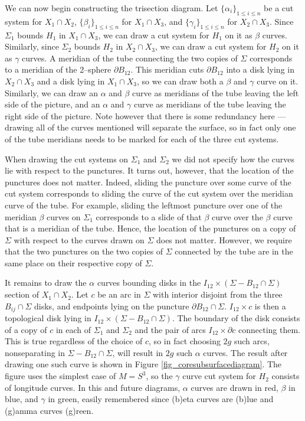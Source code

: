 \documentclass[12pt]{amsart}
\newcommand{\del}{\partial }
\theoremstyle{definition}
\theoremstyle{remark}
\begin{document}
We can now begin constructing the trisection diagram.  Let $\{\alpha_i\}_{1 \le i \le n}$ be a cut system for $X_1 \cap X_2$, $\{\beta_i\}_{1 \le i \le n}$ for $X_1 \cap X_3$, and $\{\gamma_i\}_{1 \le i \le n}$ for $X_2 \cap X_3$.  Since $\Sigma_1$ bounds $H_1$ in $X_1 \cap X_3$, we can draw a cut system for $H_1$ on it as $\beta$ curves.  Similarly, since $\Sigma_2$ bounds $H_2$ in $X_2 \cap X_3$, we can draw a cut system for $H_2$ on it as $\gamma$ curves.  A meridian of the tube connecting the two copies of $\Sigma$ corresponds to a meridian of the 2--sphere $\del B_{12}$.  This meridian cuts $\del B_{12}$ into a disk lying in $X_2 \cap X_3$ and a disk lying in $X_1 \cap X_3$, so we can draw both a $\beta$ and $\gamma$ curve on it.  Similarly, we can draw an $\alpha$ and $\beta$ curve as meridians of the tube leaving the left side of the picture, and an $\alpha$ and $\gamma$ curve as meridians of the tube leaving the right side of the picture.  Note however that there is some redundancy here --- drawing all of the curves mentioned will separate the surface, so in fact only one of the tube meridians needs to be marked for each of the three cut systems.

When drawing the cut systems on $\Sigma_1$ and $\Sigma_2$ we did not specify how the curves lie with respect to the punctures.  It turns out, however, that the location of the punctures does not matter.  Indeed, sliding the puncture over some curve of the cut system corresponds to sliding the curve of the cut system over the meridian curve of the tube.  For example, sliding the leftmost puncture over one of the meridian $\beta$ curves on $\Sigma_1$ corresponds to a slide of that $\beta$ curve over the $\beta$ curve that is a meridian of the tube.  Hence, the location of the punctures on a copy of $\Sigma$ with respect to the curves drawn on $\Sigma$ does not matter.  However, we require that the two punctures on the two copies of $\Sigma$ connected by the tube are in the same place on their respective copy of $\Sigma$.  

It remains to draw the $\alpha$ curves bounding disks in the $I_{12} \times (\Sigma - B_{12} \cap \Sigma)$ section of $X_1 \cap X_2$.   Let $c$ be an arc in $\Sigma$ with interior disjoint from the three $B_{ij} \cap \Sigma$ disks, and endpoints lying on the puncture $\del B_{12} \cap \Sigma$.  $I_{12} \times c$ is then a topological disk lying in $I_{12} \times (\Sigma - B_{12} \cap \Sigma)$.  The boundary of the disk consists of a copy of $c$ in each of $\Sigma_1$ and $\Sigma_2$ and the pair of arcs $I_{12} \times \del c$ connecting them.  This is true regardless of the choice of $c$, so in fact choosing $2g$ such arcs, nonseparating in $\Sigma - B_{12} \cap \Sigma$, will result in $2g$ such $\alpha$ curves.  The result after drawing one such curve is shown in Figure \ref{fig_coresubsurfacediagram}.  The figure uses the simplest case of $M = S^3$, so the $\gamma$ curve cut system for $H_2$ consists of longitude curves.  In this and future diagrams, $\alpha$ curves are drawn in red, $\beta$ in blue, and $\gamma$ in green, easily remembered since (b)eta curves are (b)lue and (g)amma curves (g)reen.
\end{document}
